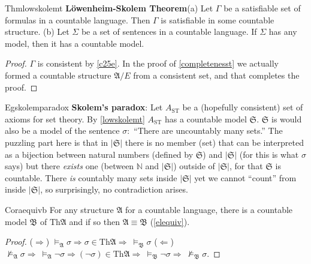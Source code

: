 \begin{reference}{Thm}{lowskolemt}
  \textbf{L\"owenheim-Skolem Theorem}\quad (a) Let $\Gamma$ be a satisfiable set of formulas in a countable language. Then $\Gamma$ is satisfiable in some countable structure. (b) Let $\Sigma$ be a set of sentences in a countable language. If $\Sigma$ has any model, then it has a countable model.
\end{reference}

\begin{proof}
  $\Gamma$ is consistent by \ref{c25e}. In the proof of \ref{completenesst} we actually formed a countable structure $\mathfrak{A}/E$ from a consistent set, and that completes the proof.
\end{proof}


\begin{reference}{Eg}{skolemparadox}
  \textbf{Skolem's paradox}: Let $A_{\mathrm{ST}}$ be a (hopefully consistent) set of axioms for set theory. By \ref{lowskolemt} $A_{\mathrm{ST}}$ has a countable model $\mathfrak{S}$. $\mathfrak{S}$ is would also be a model of the sentence $\sigma:$ ``There are uncountably many sets.'' The puzzling part here is that in $|\mathfrak{S}|$ there is no member (set) that can be interpreted as a bijection between natural numbers (defined by $\mathfrak{S}$) and $|\mathfrak{S}|$ (for this is what $\sigma$ says) but there \textit{exists} one (between $\mathbb{N}$ and $|\mathfrak{S}|$) outside of $|\mathfrak{S}|$, for that $\mathfrak{S}$ is countable. There \textit{is} countably many sets inside $|\mathfrak{S}|$ yet we cannot ``count'' from inside $|\mathfrak{S}|$, so surprisingly, no contradiction arises.
\end{reference}

\begin{reference}{Cor}{aequivb}
  For any structure $\mathfrak{A}$ for a countable language, there is a countable model $\mathfrak{B}$ of $\mathrm{Th}\mathfrak{A}$ and if so then $\mathfrak{A}\equiv \mathfrak{B}$ (\ref{elequiv}).
\end{reference}

\begin{proof}
  ($\Rightarrow$) $\vDash_{\mathfrak{A}}\sigma\Rightarrow \sigma\in \text{Th}\mathfrak{A}\Rightarrow\ \vDash_{\mathfrak{B}}\sigma$\newline
  ($\Leftarrow$) $\not\vDash_{\mathfrak{A}}\sigma\Rightarrow\ \vDash_{\mathfrak{A}}\neg \sigma\Rightarrow (\neg \sigma)\in\text{Th}\mathfrak{A}\Rightarrow\ \vDash_{\mathfrak{B}}\neg \sigma\Rightarrow\ \not\vDash_{\mathfrak{B}}\sigma$.
\end{proof}

